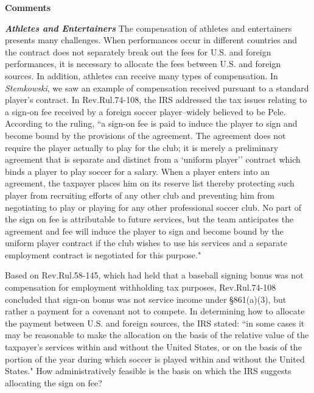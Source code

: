 	\begin{center}
			\textbf{Comments}
		\end{center}


\textbf{\emph{Athletes and Entertainers}}  The compensation of athletes and entertainers presents many challenges.  When performances occur in different countries and the contract does not separately break out the fees for U.S. and foreign performances, it is necessary to allocate the fees between U.S. and foreign sources.  In addition, athletes can receive many types of compensation. In \emph{Stemkowski}, we saw an example of compensation received pursuant to a standard player's contract.  In Rev.\@ Rul.\@ 74-108, the IRS addressed the tax issues relating to a sign-on fee received by a foreign soccer player--widely believed to be Pele.  According to the ruling, ``a sign-on fee is paid to induce the player to sign and become bound by the provisions of the agreement. The agreement does not require the player actually to play for the club; it is merely a preliminary agreement that is separate and distinct from a `uniform player'' contract which binds a player to play soccer for a salary. When a player enters into an agreement, the taxpayer places him on its reserve list thereby protecting such player from recruiting efforts of any other club and preventing him from negotiating to play or playing for any other professional soccer club. No part of the sign on fee is attributable to future services, but the team anticipates the agreement and fee will induce the player to sign and become bound by the uniform player contract if the club wishes to use his services and a separate employment contract is negotiated for this purpose."  

Based on Rev.\@ Rul.\@ 58-145, which had held that a baseball signing bonus was not compensation for employment withholding tax purposes, Rev.\@ Rul.\@ 74-108 concluded that sign-on bonus was not service income under \S861(a)(3), but rather a payment for a covenant not to compete.  In determining how to allocate the payment between U.S. and foreign sources, the IRS stated: ``in some cases it may be reasonable to make the allocation on the basis of the relative value of the taxpayer's services within and without the United States, or on the basis of the portion of the year during which soccer is played within and without the United States."  How administratively feasible is the basis on which the IRS suggests allocating the sign on fee? 

